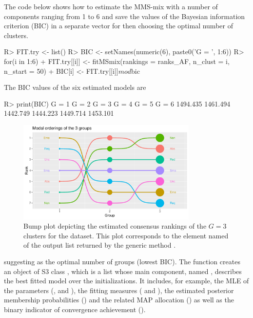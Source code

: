 The code below shows how to estimate the MMS-mix with a number of components ranging from 1 to 6 and save the values of the Bayesian information criterion (BIC) in a separate vector for then choosing the optimal number of clusters.
\begin{example}
R> FIT.try <- list()
R> BIC <- setNames(numeric(6), paste0('G = ', 1:6))
R> for(i in 1:6){
+    FIT.try[[i]] <- fitMSmix(rankings = ranks_AF, n_clust = i, n_start = 50)
+    BIC[i] <- FIT.try[[i]]$mod$bic}
\end{example}
The BIC values of the six estimated models are
\begin{example}
R> print(BIC)
   G = 1    G = 2    G = 3    G = 4    G = 5    G = 6 
1494.435 1461.494 1442.749 1444.223 1449.714 1453.101  
\end{example}
\begin{figure}[t]
\centering
\includegraphics[width=0.8\textwidth]{figures/RJ2025_paper_cons.pdf}
\caption{Bump plot depicting the estimated consensus rankings of the ${G}=3$ clusters for the  dataset. This plot corresponds to the element named  of the output list returned by the generic method .}
 \label{f:antifr_plot1}
\end{figure}
suggesting  as the optimal number of groups (lowest BIC). 
The function  creates an object of S3 class , which is a list whose main component, named  , describes the best fitted model over the  initializations. It includes, for example, the MLE of the parameters (,  and ), the fitting measures ( and ), the estimated posterior membership probabilities () and the related MAP allocation () as well as the binary indicator of convergence achievement ().  

